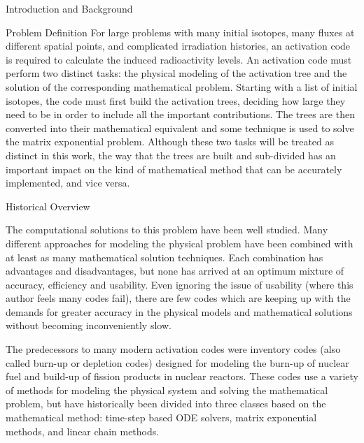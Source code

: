 \begin{chapter}{Introduction and Background}
\begin{section}{Problem Definition\label{sec:intro.prob_def}}
    For large problems with many initial isotopes, many fluxes at
    different spatial points, and complicated irradiation histories,
    an activation code is required to calculate the induced
    radioactivity levels.  An activation code must perform two
    distinct tasks: the physical modeling of the activation tree and
    the solution of the corresponding mathematical problem.  Starting
    with a list of initial isotopes, the code must first build the
    activation trees, deciding how large they need to be in order to
    include all the important contributions.  The trees are then
    converted into their mathematical equivalent and some technique is
    used to solve the matrix exponential problem.  Although these two
    tasks will be treated as distinct in this work, the way that the
    trees are built and sub-divided has an important impact on the
    kind of mathematical method that can be accurately implemented,
    and vice versa.
    
  \end{section}
  
  \begin{section}{Historical Overview}
    
    The computational solutions to this problem have been well
    studied\cite{adjoint}.  Many different approaches for modeling the
    physical problem have been combined with at least as many
    mathematical solution techniques.  Each combination has advantages
    and disadvantages, but none has arrived at an optimum mixture of
    accuracy, efficiency and usability.  Even ignoring the issue of
    usability (where this author feels many codes fail), there are few
    codes which are keeping up with the demands for greater accuracy
    in the physical models and mathematical solutions without becoming
    inconveniently slow.
  
    The predecessors to many modern activation codes were inventory
    codes (also called burn-up or depletion codes) designed for
    modeling the burn-up of nuclear fuel and build-up of fission
    products in nuclear reactors.  These codes use a variety of
    methods for modeling the physical system and solving the
    mathematical problem, but have historically been divided into
    three classes based on the mathematical method: time-step based
    ODE solvers, matrix exponential methods, and linear chain methods.
  

\end{section}
\end{chapter}
